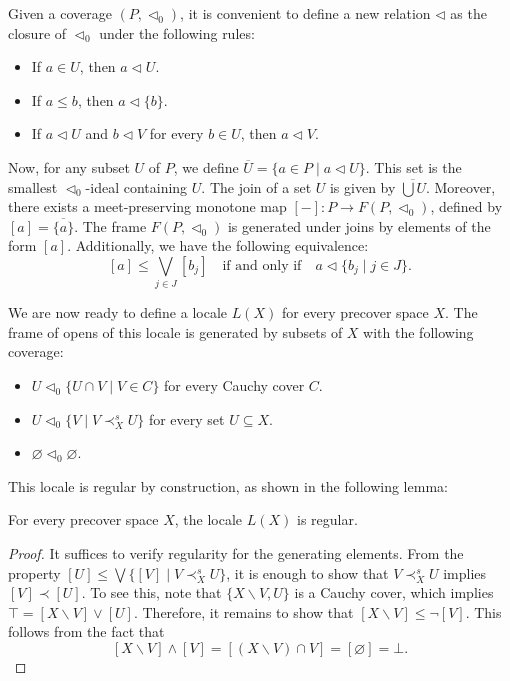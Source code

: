 \documentclass[pdflatex,sn-mathphys-num]{sn-jnl}
\theoremstyle{definition}
\theoremstyle{remark}
\numberwithin{figure}{section}
\newcommand{\rb}{\prec}
\begin{document}
Given a coverage $(P,\triangleleft_0)$, it is convenient to define a new relation $\triangleleft$ as the closure of $\triangleleft_0$ under the following rules:
\begin{itemize}
\item If $a \in U$, then $a \triangleleft U$.
\item If $a \leq b$, then $a \triangleleft \{ b \}$.
\item If $a \triangleleft U$ and $b \triangleleft V$ for every $b \in U$, then $a \triangleleft V$.
\end{itemize}

Now, for any subset $U$ of $P$, we define $\overline{U} = \{ a \in P \mid a \triangleleft U \}$.
This set is the smallest $\triangleleft_0$-ideal containing $U$.
The join of a set $U$ is given by $\overline{\bigcup U}$.
Moreover, there exists a meet-preserving monotone map $[-] : P \to F(P,\triangleleft_0)$, defined by $[a] = \overline{ \{ a \} }$.
The frame $F(P,\triangleleft_0)$ is generated under joins by elements of the form $[a]$.
Additionally, we have the following equivalence:
\[
[a] \leq \bigvee_{j \in J} [b_j] \quad \text{if and only if} \quad a \triangleleft \{ b_j \mid j \in J \}.
\]

We are now ready to define a locale $L(X)$ for every precover space $X$.
The frame of opens of this locale is generated by subsets of $X$ with the following coverage:
\begin{itemize}
\item $U \triangleleft_0 \{ U \cap V \mid V \in C \}$ for every Cauchy cover $C$.
\item $U \triangleleft_0 \{ V \mid V \rb^s_X U \}$ for every set $U \subseteq X$.
\item $\varnothing \triangleleft_0 \varnothing$.
\end{itemize}

This locale is regular by construction, as shown in the following lemma:

\begin{lem}
For every precover space $X$, the locale $L(X)$ is regular.
\end{lem}
\begin{proof}
It suffices to verify regularity for the generating elements.
From the property $[U] \leq \bigvee \{ [V] \mid V \rb^s_X U \}$, it is enough to show that $V \rb^s_X U$ implies $[V] \rb [U]$.
To see this, note that $\{ X \backslash V, U \}$ is a Cauchy cover, which implies $\top = [X \backslash V] \vee [U]$.
Therefore, it remains to show that $[X \backslash V] \leq \neg [V]$.
This follows from the fact that 
\[
[X \backslash V] \wedge [V] = [(X \backslash V) \cap V] = [\varnothing] = \bot.
\]
\end{proof}
\end{document}
